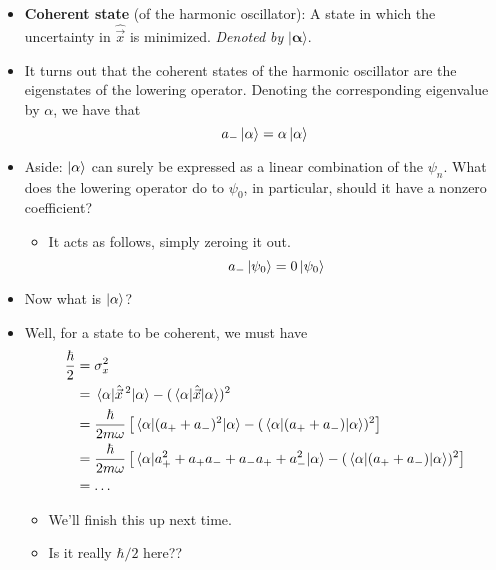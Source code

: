 \documentclass[../notes.tex]{subfiles}
\begin{document}
\begin{itemize}
\begin{itemize}
    \end{itemize}
    \item \textbf{Coherent state} (of the harmonic oscillator): A state in which the uncertainty in $\hat{\vec{x}}$ is minimized. \emph{Denoted by} $\bm{|\alpha\rangle}$.
    \item It turns out that the coherent states of the harmonic oscillator are the eigenstates of the lowering operator. Denoting the corresponding eigenvalue by $\alpha$, we have that
    \begin{equation*}
        a_-\ket{\alpha} = \alpha\ket{\alpha}
    \end{equation*}
    \item Aside: $\ket{\alpha}$ can surely be expressed as a linear combination of the $\psi_n$. What does the lowering operator do to $\psi_0$, in particular, should it have a nonzero coefficient?
    \begin{itemize}
        \item It acts as follows, simply zeroing it out.
        \begin{equation*}
            a_-\ket{\psi_0} = 0\ket{\psi_0}
        \end{equation*}
    \end{itemize}
    \item Now what is $\ket{\alpha}$?
    \item Well, for a state to be coherent, we must have
    \begin{align*}
        \frac{\hbar}{2} &= \sigma_x^2\\
        &= \ev{\hat{\vec{x}}{\,}^2}{\alpha}-(\ev{\hat{\vec{x}}}{\alpha})^2\\
        &= \frac{\hbar}{2m\omega}\left[ \ev{(a_++a_-)^2}{\alpha}-(\ev{(a_++a_-)}{\alpha})^2 \right]\\
        &= \frac{\hbar}{2m\omega}\left[ \ev{a_+^2+a_+a_-+a_-a_++a_-^2}{\alpha}-(\ev{(a_++a_-)}{\alpha})^2 \right]\\
        &= \dots
    \end{align*}
    \begin{itemize}
        \item We'll finish this up next time.
        \item Is it really $\hbar/2$ here??
    \end{itemize}
\end{itemize}
\end{document}
